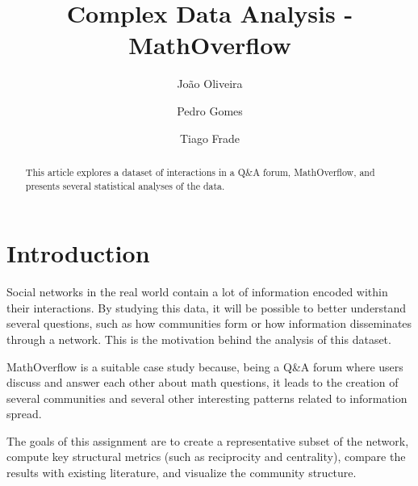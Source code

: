 \documentclass[sigplan]{acmart}
\begin{document}
\title{Complex Data Analysis - MathOverflow}

\author{João Oliveira}

\author{Pedro Gomes}

\author{Tiago Frade}


\pagestyle{plain} %

\begin{abstract}
  This article explores a dataset of interactions in a Q\&A forum, MathOverflow, and presents several statistical analyses of the data.
\end{abstract}

\maketitle

\section{Introduction}\label{sec:introduction}
        Social networks in the real world contain a lot of information encoded within their interactions. By studying this data, it will be possible to better understand several questions, such as how communities form or how information disseminates through a network. This is the motivation behind the analysis of this dataset.
        
        MathOverflow is a suitable case study because, being a Q\&A forum where users discuss and answer each other about math questions, it leads to the creation of several communities and several other interesting patterns related to information spread.
        
        The goals of this assignment are to create a representative subset of the network, compute key structural metrics (such as reciprocity and centrality), compare the results with existing literature, and visualize the community structure.
    
\end{document}
